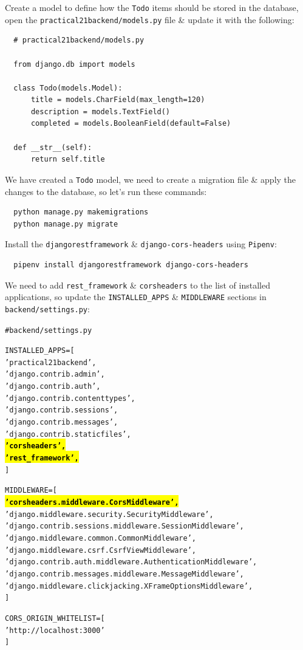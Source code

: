 \documentclass{article}
\begin{document}
Create a model to define how the \texttt{Todo} items should be stored in the database, open the \texttt{practical21backend/models.py} file \& update it with the following:

\begin{verbatim}
  # practical21backend/models.py

  from django.db import models

  class Todo(models.Model):
      title = models.CharField(max_length=120)
      description = models.TextField()
      completed = models.BooleanField(default=False)

  def __str__(self):
      return self.title
\end{verbatim}

We have created a \texttt{Todo} model, we need to create a migration file \& apply the changes to the database, so let’s run these commands:

\begin{verbatim}
  python manage.py makemigrations
  python manage.py migrate 
\end{verbatim}

Install the \texttt{djangorestframework} \& \texttt{django-cors-headers} using \texttt{Pipenv}:

\begin{verbatim}
  pipenv install djangorestframework django-cors-headers
\end{verbatim}

We need to add \texttt{rest\_framework} \& \texttt{corsheaders} to the list of installed applications, so update the \texttt{INSTALLED\_APPS} \& \texttt{MIDDLEWARE} sections in \texttt{backend/settings.py}:

\begin{alltt}
  # backend/settings.py

  INSTALLED_APPS = [
      'practical21backend',
      'django.contrib.admin',
      'django.contrib.auth',
      'django.contrib.contenttypes',
      'django.contrib.sessions',
      'django.contrib.messages',
      'django.contrib.staticfiles',
      \hl{\textbf{'corsheaders',}}                          
      \hl{\textbf{'rest_framework',}}          
  ]

  MIDDLEWARE = [
      \hl{\textbf{'corsheaders.middleware.CorsMiddleware',}} 
      'django.middleware.security.SecurityMiddleware',
      'django.contrib.sessions.middleware.SessionMiddleware',
      'django.middleware.common.CommonMiddleware',
      'django.middleware.csrf.CsrfViewMiddleware',
      'django.contrib.auth.middleware.AuthenticationMiddleware',
      'django.contrib.messages.middleware.MessageMiddleware',
      'django.middleware.clickjacking.XFrameOptionsMiddleware',
  ]

  CORS_ORIGIN_WHITELIST = [
    'http://localhost:3000'
  ]

\end{alltt}
\end{document}
